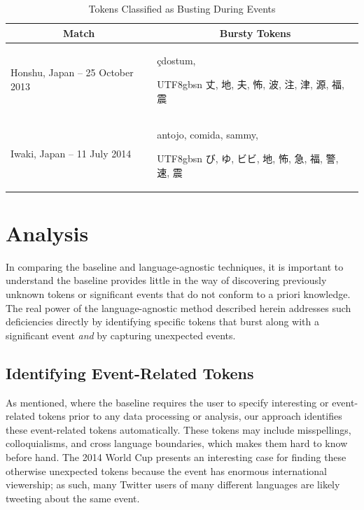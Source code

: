 \documentclass{sig-alternate}
\newcommand{\myfont}{gbsn}
\begin{document}
\begin{table}[htdp]
\caption{Tokens Classified as Busting During Events}
\begin{center}
\begin{tabular}{|p{1.45in} | p{1.45in} |}
\hline
\multicolumn{1}{|c|}{\textbf{Match}} & \multicolumn{1}{|c|}{\textbf{Bursty Tokens}} \\ \hline
Honshu, Japan -- 25 October 2013 & \c{c}dostum, \begin{CJK}{UTF8}{\myfont} 丈, 地, 夫, 怖, 波, 注, 津, 源, 福, 震 \end{CJK} \\ \hline
Iwaki, Japan -- 11 July 2014 & antojo, comida, sammy, \begin{CJK}{UTF8}{\myfont} び, ゆ, ビビ, 地, 怖, 急, 福, 警, 速, 震 \end{CJK} \\ \hline
\end{tabular}
\end{center}
\label{tab:japanTokens}
\end{table}

\section{Analysis}
\label{sect:analysis}

In comparing the baseline and language-agnostic techniques, it is important to understand the baseline provides little in the way of discovering previously unknown tokens or significant events that do not conform to a priori knowledge.
The real power of the language-agnostic method described herein addresses such deficiencies directly by identifying specific tokens that burst along with a significant event \emph{and} by capturing unexpected events.

\subsection{Identifying Event-Related Tokens}

As mentioned, where the baseline requires the user to specify interesting or event-related tokens prior to any data processing or analysis, our approach identifies these event-related tokens automatically.
These tokens may include misspellings, colloquialisms, and cross language boundaries, which makes them hard to know before hand.
The 2014 World Cup presents an interesting case for finding these otherwise unexpected tokens because the event has enormous international viewership; as such, many Twitter users of many different languages are likely tweeting about the same event.
\end{document}
